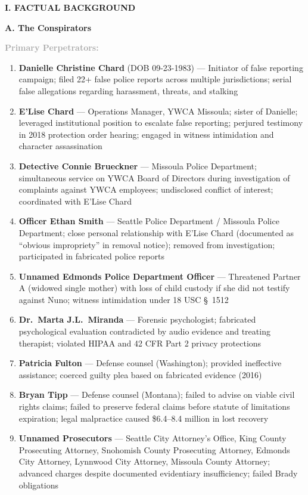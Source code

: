 \documentclass[11pt, letterpaper]{article}
\newcommand{\sectiontitle}[1]{\vspace{0.2in}\noindent\textcolor{NavyBlue}{\large\textbf{#1}}\vspace{0.1in}}
\newcommand{\subsectiontitle}[1]{\vspace{0.15in}\noindent\textcolor{NavyBlue}{\textbf{#1}}\vspace{0.05in}}
\newcommand{\subsubsectiontitle}[1]{\vspace{0.1in}\noindent\textcolor{DarkGray}{\textbf{#1}}\vspace{0.05in}}
\begin{document}
\sectiontitle{I. FACTUAL BACKGROUND}

\subsectiontitle{A. The Conspirators}

\subsubsectiontitle{Primary Perpetrators:}
\begin{enumerate}[leftmargin=*,itemsep=3pt]
    \item \textbf{Danielle Christine Chard} (DOB 09-23-1983) --- Initiator of false reporting campaign; filed 22+ false police reports across multiple jurisdictions; serial false allegations regarding harassment, threats, and stalking
    \item \textbf{E'Lise Chard} --- Operations Manager, YWCA Missoula; sister of Danielle; leveraged institutional position to escalate false reporting; perjured testimony in 2018 protection order hearing; engaged in witness intimidation and character assassination
    \item \textbf{Detective Connie Brueckner} --- Missoula Police Department; simultaneous service on YWCA Board of Directors during investigation of complaints against YWCA employees; undisclosed conflict of interest; coordinated with E'Lise Chard
    \item \textbf{Officer Ethan Smith} --- Seattle Police Department / Missoula Police Department; close personal relationship with E'Lise Chard (documented as ``obvious impropriety'' in removal notice); removed from investigation; participated in fabricated police reports
    \item \textbf{Unnamed Edmonds Police Department Officer} --- Threatened Partner A (widowed single mother) with loss of child custody if she did not testify against Nuno; witness intimidation under 18 USC \S\ 1512
    \item \textbf{Dr.\ Marta J.L.\ Miranda} --- Forensic psychologist; fabricated psychological evaluation contradicted by audio evidence and treating therapist; violated HIPAA and 42 CFR Part 2 privacy protections
    \item \textbf{Patricia Fulton} --- Defense counsel (Washington); provided ineffective assistance; coerced guilty plea based on fabricated evidence (2016)
    \item \textbf{Bryan Tipp} --- Defense counsel (Montana); failed to advise on viable civil rights claims; failed to preserve federal claims before statute of limitations expiration; legal malpractice caused \$6.4--8.4 million in lost recovery
    \item \textbf{Unnamed Prosecutors} --- Seattle City Attorney's Office, King County Prosecuting Attorney, Snohomish County Prosecuting Attorney, Edmonds City Attorney, Lynnwood City Attorney, Missoula County Attorney; advanced charges despite documented evidentiary insufficiency; failed Brady obligations
\end{enumerate}
\end{document}
